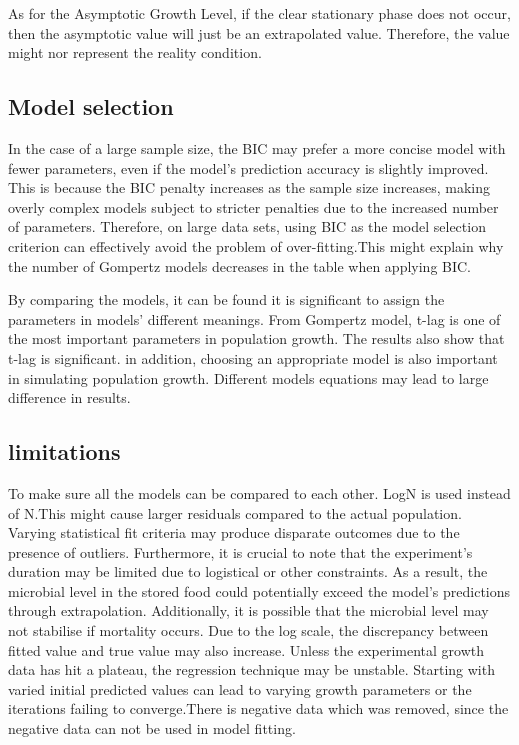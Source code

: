 \documentclass{article}
\begin{document}
 As for the Asymptotic Growth Level, if the clear stationary phase does not occur, then the asymptotic value will just be an extrapolated value\cite{peleg2011}. Therefore, the value might nor represent the reality condition. 


\subsection{Model selection}
In the case of a large sample size, the BIC may prefer a more concise model with fewer parameters, even if the model's prediction accuracy is slightly improved. This is because the BIC penalty increases as the sample size increases, making overly complex models subject to stricter penalties due to the increased number of parameters\cite{kuha2004}. Therefore, on large data sets, using BIC as the model selection criterion can effectively avoid the problem of over-fitting.This might explain why the number of Gompertz models decreases in the table when applying BIC.


By comparing the models, it can be found it is significant to assign the parameters in models’ different meanings. From Gompertz model, t-lag is one of the most important parameters in population growth. The results also show that t-lag is significant. in addition, choosing an appropriate model is also important in simulating population growth. Different models equations may lead to large difference in results. 

\subsection{limitations}
To make sure all the models can be compared to each other. LogN is used instead of N.This might cause larger residuals compared to the actual population.
Varying statistical fit criteria may produce disparate outcomes due to the presence of outliers. Furthermore, it is crucial to note that the experiment's duration may be limited due to logistical or other constraints. As a result, the microbial level in the stored food could potentially exceed the model's predictions through extrapolation. Additionally, it is possible that the microbial level may not stabilise if mortality occurs\cite{peleg2011}. 
Due to the log scale, the discrepancy between fitted value and true value may also increase. Unless the experimental growth data has hit a plateau, the regression technique may be unstable. Starting with varied initial predicted values can lead to varying growth parameters or the iterations failing to converge.There is negative data which was removed, since the negative data can not be used in model fitting.
\end{document}
